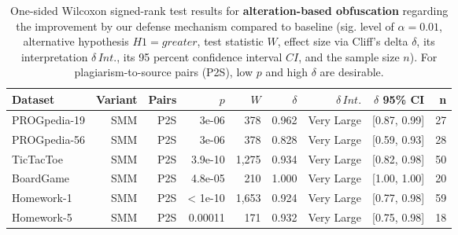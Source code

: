 \begin{table}[h]
\centering
\small
\begin{tabular}{lrrrrrrrr}
  \toprule
Dataset & Variant & Pairs & $p$ & $W$ & $\delta$ & $\delta\,Int.$ & $\delta$ 95\% CI & n \\ 
  \midrule
   PROGpedia-19& SMM & P2S & 3e-06 & 378 & 0.962 & Very Large & [0.87, 0.99] & 27 \\ 
   PROGpedia-56& SMM & P2S & 3e-06 & 378 & 0.828 & Very Large & [0.59, 0.93] & 28 \\ 
   TicTacToe& SMM & P2S & 3.9e-10 & 1,275 & 0.934 & Very Large & [0.82, 0.98] & 50 \\ 
   BoardGame & SMM & P2S & 4.8e-05 & 210 & 1.000 & Very Large & [1.00, 1.00] & 20 \\ 
   Homework-1& SMM & P2S & < 1e-10 & 1,653 & 0.924 & Very Large & [0.77, 0.98] & 59 \\ 
   Homework-5& SMM & P2S & 0.00011 & 171 & 0.932 & Very Large & [0.75, 0.98] & 18 \\ 
   \bottomrule
\end{tabular}
\caption[Statistical Tests: Alteration-based Obfuscation]{One-sided Wilcoxon signed-rank test results for \textbf{alteration-based obfuscation} regarding the improvement by our defense mechanism compared to baseline (sig. level of $\alpha=0.01$, alternative hypothesis $H1=greater$, test statistic $W$, effect size via Cliff's delta $\delta$, its interpretation $\delta\,Int.$, its 95 percent confidence interval $CI$, and the sample size $n$). For plagiarism-to-source pairs (P2S), low $p$ and high $\delta$ are desirable.} 
\label{tab:to-base-alter}
\end{table}
